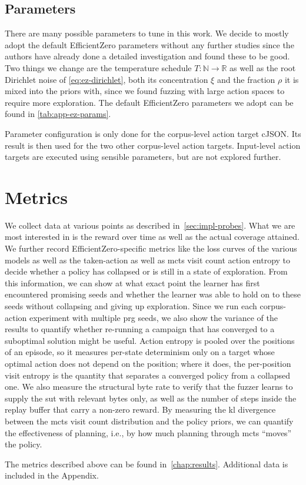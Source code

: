 \subsection{Parameters}

There are many possible parameters to tune in this work.
We decide to mostly adopt the default EfficientZero parameters without any further studies
since the authors have already done a detailed investigation and found these to be good.
Two things we change are the temperature schedule $T:\mathbb{N}\rightarrow\mathbb{R}$ as well as
the root Dirichlet noise of \cref{eq:ez-dirichlet}, both its concentration $\xi$ and the fraction
$\rho$ it is mixed into the priors with, since we found fuzzing with large action spaces to require
more exploration.
The default EfficientZero parameters we adopt can be found in \cref{tab:app-ez-params}.

Parameter configuration is only done for the corpus-level action target cJSON.
Its result is then used for the two other corpus-level action targets.
Input-level action targets are executed using sensible parameters, but are not
explored further.

\section{Metrics}\label{sec:methodology-metrics}

We collect data at various points as described in~\cref{sec:impl-probes}.
What we are most interested in is the reward over time as well as the actual
coverage attained.
We further record EfficientZero-specific metrics like the loss curves of the
various models as well as the taken-action as well as \gls{mcts} visit count action
entropy to decide whether a policy has collapsed or is still in a state of
exploration.
From this information, we can show at what exact point the learner has first
encountered promising seeds and whether the learner was able to hold on to
these seeds without collapsing and giving up exploration.
Since we run each corpus-action experiment with multiple \gls{prg} seeds, we also show the variance of
the results to quantify whether re-running a campaign that has converged to a suboptimal
solution might be useful.
Action entropy is pooled over the positions of an episode, so it measures per-state determinism
only on a target whose optimal action does not depend on the position; where it does, the
per-position visit entropy is the quantity that separates a converged policy from a collapsed one.
We also measure the structural byte rate to verify that the fuzzer learns to
supply the \gls{sut} with relevant bytes only, as well as the number of steps inside
the replay buffer that carry a non-zero reward.
By measuring the \gls{kl} divergence between the \gls{mcts} visit count distribution and the
policy priors, we can quantify the effectiveness of planning, i.e., by how much
planning through \gls{mcts} \enquote{moves} the policy.

The metrics described above can be found in~\cref{chap:results}.
Additional data is included in the Appendix.
